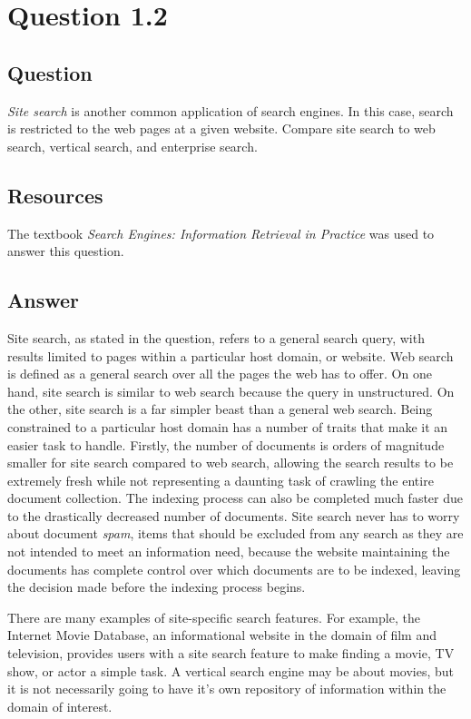 \section{Question 1.2}


\subsection{Question}
\textit{Site search} is another common application of search engines. In this case, search is restricted to the web pages at a given website. Compare site search to web search, vertical search, and enterprise search.


\subsection{Resources}
The textbook \textit{Search Engines: Information Retrieval in Practice} \cite{seirip} was used to answer this question.


\subsection{Answer}
Site search, as stated in the question, refers to a general search query, with results limited to pages within a particular host domain, or website.  Web search is defined as a general search over all the pages the web has to offer.  On one hand, site search is similar to web search because the query in unstructured.  On the other, site search is a far simpler beast than a general web search.  Being constrained to a particular host domain has a number of traits that make it an easier task to handle.  Firstly, the number of documents is orders of magnitude smaller for site search compared to web search, allowing the search results to be extremely fresh while not representing a daunting task of crawling the entire document collection.  The indexing process can also be completed much faster due to the drastically decreased number of documents.  Site search never has to worry about document \textit{spam}, items that should be excluded from any search as they are not intended to meet an information need, because the website maintaining the documents has complete control over which documents are to be indexed, leaving the decision made before the indexing process begins.

There are many examples of site-specific search features.  For example, the Internet Movie Database, an informational website in the domain of film and television, provides users with a site search feature to make finding a movie, TV show, or actor a simple task.  A vertical search engine may be about movies, but it is not necessarily going to have it's own repository of information within the domain of interest.

